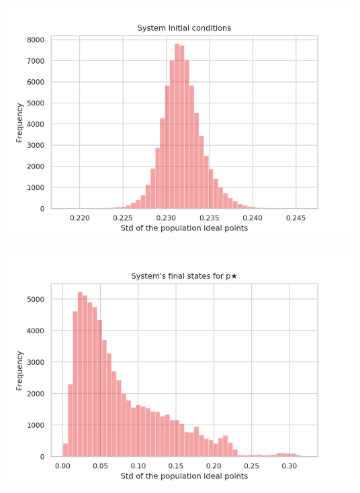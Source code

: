 \documentclass{article}
\begin{document}
\begin{figure}[H]
  \centering
  
    \begin{subfigure}[b]{0.49\textwidth}
      \includegraphics[width=\textwidth]{img/initstd.png}
    \end{subfigure}
    \begin{subfigure}[b]{0.49\textwidth}
      \includegraphics[width=\textwidth]{img/Ystd*.png}
     \end{subfigure}


\end{figure}
\end{document}
